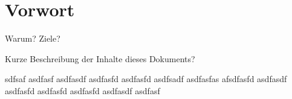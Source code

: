 \chapter*{Vorwort}

Warum? Ziele?

Kurze Beschreibung der Inhalte dieses Dokuments?

sdfsaf asdfasf asdfasdf asdfasfd asdfasfd asdfsadf asdfasfas afsdfasfd asdfasdf asdfasfd asdfasfd asdfasfd asdfasdf asdfasf 
